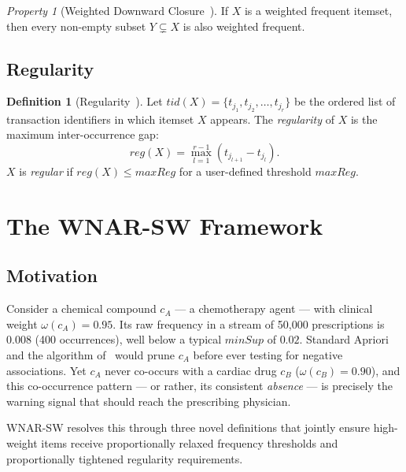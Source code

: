 \documentclass[10pt,twocolumn]{article}
\theoremstyle{plain}
\theoremstyle{definition}
\newtheorem{definition}{Definition}[section]
\theoremstyle{remark}
\newtheorem{property}{Property}[section]
\newcommand{\minSup}{\mathit{minSup}}
\begin{document}
\begin{property}[Weighted Downward Closure~\cite{ouyang2015}]
\label{prop:closure}
If $X$ is a weighted frequent itemset, then every non-empty
subset $Y \subsetneq X$ is also weighted frequent.
\end{property}

\subsection{Regularity}

\begin{definition}[Regularity~\cite{tanbeer2010stream}]
\label{def:regularity}
Let $\mathit{tid}(X) = \{t_{j_1}, t_{j_2}, \ldots, t_{j_r}\}$ be the
ordered list of transaction identifiers in which itemset $X$ appears.
The \emph{regularity} of $X$ is the maximum inter-occurrence gap:
\[
  \mathit{reg}(X) = \max_{l=1}^{r-1}(t_{j_{l+1}} - t_{j_l}).
\]
$X$ is \emph{regular} if $\mathit{reg}(X) \leq \mathit{maxReg}$
for a user-defined threshold $\mathit{maxReg}$.
\end{definition}

\section{The WNAR-SW Framework}
\label{sec:method}

\subsection{Motivation}

Consider a chemical compound $c_A$ — a chemotherapy agent — with
clinical weight $\omega(c_A) = 0.95$.
Its raw frequency in a stream of 50{,}000 prescriptions is $0.008$
(400 occurrences), well below a typical $\minSup$ of $0.02$.
Standard Apriori and the algorithm of~\cite{sastry2025} would prune
$c_A$ before ever testing for negative associations.
Yet $c_A$ never co-occurs with a cardiac drug $c_B$
($\omega(c_B) = 0.90$), and this co-occurrence pattern — or rather,
its consistent \emph{absence} — is precisely the warning signal that
should reach the prescribing physician.

WNAR-SW resolves this through three novel definitions that jointly
ensure high-weight items receive proportionally relaxed frequency
thresholds and proportionally tightened regularity requirements.
\end{document}
